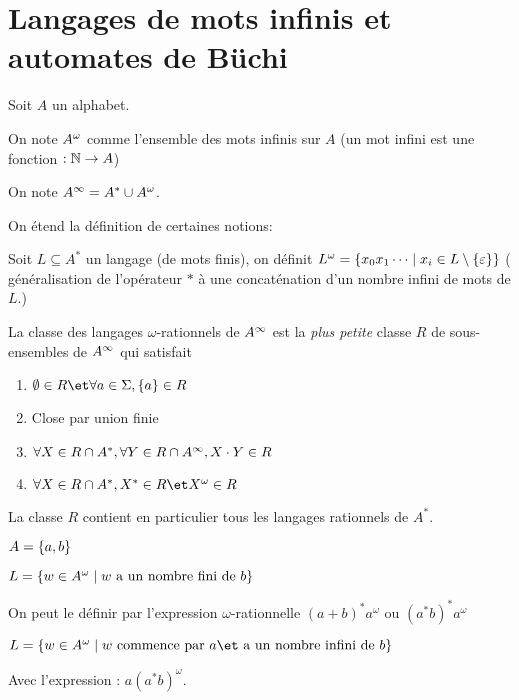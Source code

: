 \section{Langages de mots infinis et automates de Büchi}


\begin{notation}
	Soit $A$ un alphabet.

	On note $A^{\omega}$ comme l'ensemble des mots infinis sur $A$
	(un mot infini est une fonction $: \mathbb{N} \to A$)

	On note $A^{\infty} = A^* \cup A^{\omega}$.

	On étend la définition de certaines notions:

	Soit $L \subseteq A^*$ un langage (de mots finis), on définit
	$L^{\omega} = \left\{x_0x_1\cdots \mid x_i \in L \setminus \left\{\varepsilon\right\}\right\}$
	( généralisation de l'opérateur $*$ à une concaténation d'un nombre infini de mots de $L$.)
\end{notation}


\begin{definition}
	La classe des langages $\omega$-rationnels de $A^{\infty}$ est la \emph{plus petite}
	classe $R$ de sous-ensembles de $A^{\infty}$ qui satisfait
	\begin{enumerate}
		\item $\emptyset \in R \et \forall a \in \Sigma, \set a \in R$
		\item Close par union finie
		\item $\forall X \in R \cap A^*, \forall Y \in R \cap A^{\infty}, X \cdot Y \in R$ \label{omega-clot-fi}
		\item $\forall X \in R \cap A^*, X^* \in R \et X^{\omega} \in R$\label{omega-clot-op}
	\end{enumerate}
\end{definition}

\begin{remarque}
	La classe $R$ contient en particulier tous les langages rationnels de $A^*$.
\end{remarque}

\begin{exemple}
	$A = \left\{a,b\right\}$

	$L = \left\{w \in A^{\omega} \mid w \text{ a un nombre fini de } b\right\}$

	On peut le définir par l'expression $\omega$-rationnelle $(a + b)^* a^{\omega}$ ou $(a^*b)^* a^{\omega}$


	$L = \setdef {w \in \aomega} {w \text{ commence par } a \et \text{ a un nombre infini de } b}$

	Avec l'expression : $a(a^*b)^{\omega}$.
\end{exemple}

